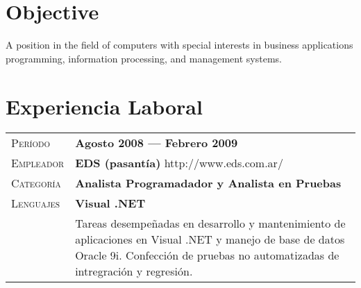 \documentclass[a4paper, oneside, final]{scrartcl} %
\newcommand{\gray}{\rowcolor[gray]{.90}} %
\begin{document}
\begin{center} %


{\fontsize{36}{36}\selectfont\scshape{}} %

\vspace{1.5cm} %


\section{Objective}

A position in the field of computers with special interests in business applications \\ programming, information processing, and management systems.


\section{Experiencia Laboral}

\begin{tabularx}{0.97\linewidth}{>{\raggedleft\scshape}p{2cm}X}
\gray Período   & \textbf{Agosto 2008 --- Febrero 2009}\\
\gray Empleador & \textbf{EDS (pasantía)} \hfill http://www.eds.com.ar/\\
\gray Categoría & \textbf{Analista Programadador y Analista en Pruebas}\\
\gray Lenguajes & \textbf{Visual .NET}\\
       & Tareas desempeñadas en desarrollo y mantenimiento de aplicaciones en Visual .NET y manejo de base de datos Oracle 9i. Confección de pruebas no automatizadas de intregración y regresión.
\end{tabularx}


\end{center}
\end{document}
